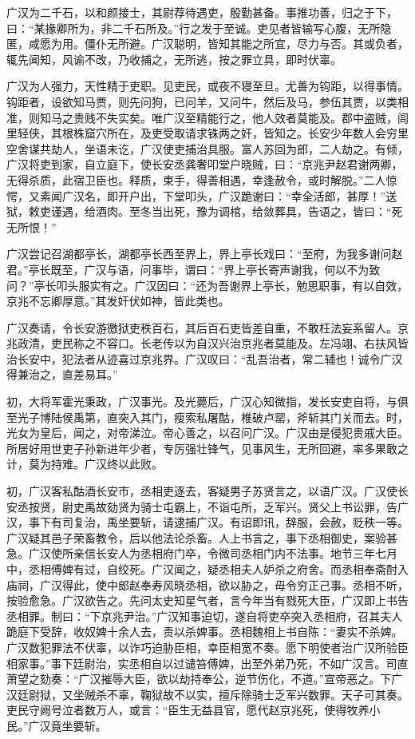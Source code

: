\documentclass[12pt,UTF8]{ctexbook}
\begin{document}
广汉为二千石，以和颜接士，其尉荐待遇吏，殷勤甚备。事推功善，归之于下，曰：“某掾卿所为，非二千石所及。”行之发于至诚。吏见者皆输写心腹，无所隐匿，咸愿为用。僵仆无所避。广汉聪明，皆知其能之所宜，尽力与否。其或负者，辄先闻知，风谕不改，乃收捕之，无所逃，按之罪立具，即时伏辜。



广汉为人强力，天性精于吏职。见吏民，或夜不寝至旦。尤善为钩距，以得事情。钩距者，设欲知马贾，则先问狗，已问羊，又问牛，然后及马，参伍其贾，以类相准，则知马之贵贱不失实矣。唯广汉至精能行之，他人效者莫能及。郡中盗贼，闾里轻侠，其根株窟穴所在，及吏受取请求铢两之奸，皆知之。长安少年数人会穷里空舍谋共劫人，坐语未讫，广汉使吏捕治具服。富人苏回为郎，二人劫之。有倾，广汉将吏到家，自立庭下，使长安丞龚奢叩堂户晓贼，曰：“京兆尹赵君谢两卿，无得杀质，此宿卫臣也。释质，束手，得善相遇，幸逢赦令，或时解脱。”二人惊愕，又素闻广汉名，即开户出，下堂叩头，广汉跪谢曰：“幸全活郎，甚厚！”送狱，敕吏谨遇，给酒肉。至冬当出死，豫为调棺，给敛葬具，告语之，皆曰：“死无所恨！”



广汉尝记召湖都亭长，湖都亭长西至界上，界上亭长戏曰：“至府，为我多谢问赵君。”亭长既至，广汉与语，问事毕，谓曰：“界上亭长寄声谢我，何以不为致问？”亭长叩头服实有之。广汉因曰：“还为吾谢界上亭长，勉思职事，有以自效，京兆不忘卿厚意。”其发奸伏如神，皆此类也。



广汉奏请，令长安游徼狱吏秩百石，其后百石吏皆差自重，不敢枉法妄系留人。京兆政清，吏民称之不容口。长老传以为自汉兴治京兆者莫能及。左冯翊、右扶风皆治长安中，犯法者从迹喜过京兆界。广汉叹曰：“乱吾治者，常二辅也！诚令广汉得兼治之，直差易耳。”



初，大将军霍光秉政，广汉事光。及光薨后，广汉心知微指，发长安吏自将，与俱至光子博陆侯禹第，直突入其门，瘦索私屠酤，椎破卢罂，斧斩其门关而去。时，光女为皇后，闻之，对帝涕泣。帝心善之，以召问广汉。广汉由是侵犯贵戚大臣。所居好用世吏子孙新进年少者，专厉强壮锋气，见事风生，无所回避，率多果敢之计，莫为持难。广汉终以此败。



初，广汉客私酤酒长安市，丞相吏逐去，客疑男子苏贤言之，以语广汉。广汉使长安丞按贤，尉史禹故劾贤为骑士屯霸上，不诣屯所，乏军兴。贤父上书讼罪，告广汉，事下有司复治，禹坐要斩，请逮捕广汉。有诏即讯，辞服，会赦，贬秩一等。广汉疑其邑子荣畜教令，后以他法论杀畜。人上书言之，事下丞相御史，案验甚急。广汉使所亲信长安人为丞相府门卒，令微司丞相门内不法事。地节三年七月中，丞相傅婢有过，自绞死。广汉闻之，疑丞相夫人妒杀之府舍。而丞相奉斋酎入庙祠，广汉得此，使中郎赵奉寿风晓丞相，欲以胁之，毋令穷正己事。丞相不听，按验愈急。广汉欲告之。先问太史知星气者，言今年当有戮死大臣，广汉即上书告丞相罪。制曰：“下京兆尹治。”广汉知事迫切，遂自将吏卒突入丞相府，召其夫人跪庭下受辞，收奴婢十余人去，责以杀婢事。丞相魏相上书自陈：“妻实不杀婢。广汉数犯罪法不伏辜，以诈巧迫胁臣相，幸臣相宽不奏。愿下明使者治广汉所验臣相家事。”事下廷尉治，实丞相自以过谴笞傅婢，出至外弟乃死，不如广汉言。司直萧望之劾奏：“广汉摧辱大臣，欲以劫持奉公，逆节伤化，不道。”宣帝恶之。下广汉廷尉狱，又坐贼杀不辜，鞠狱故不以实，擅斥除骑士乏军兴数罪。天子可其奏。吏民守阙号泣者数万人，或言：“臣生无益县官，愿代赵京兆死，使得牧养小民。”广汉竟坐要斩。
\end{document}
